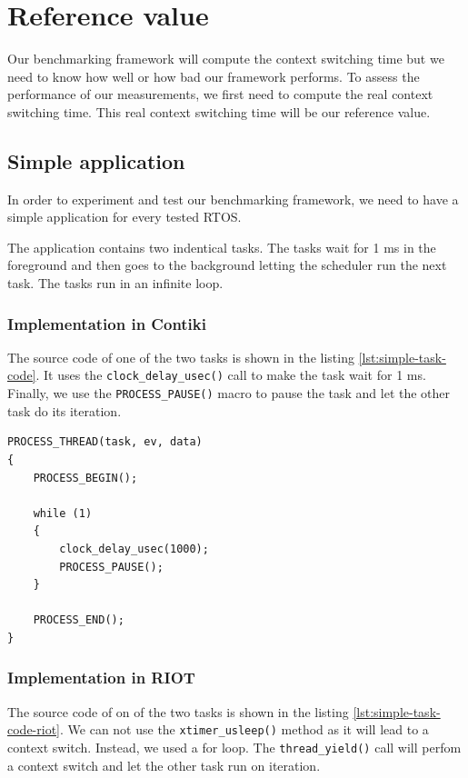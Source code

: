 \section{Reference value \label{sec:reference}}

Our benchmarking framework will compute the context switching time but we need to know how well or how bad our framework performs.
To assess the performance of our measurements, we first need to compute the real context switching time.
This real context switching time will be our reference value.

\subsection{Simple application}
In order to experiment and test our benchmarking framework, we need to have a simple application for every tested RTOS.

The application contains two indentical tasks.
The tasks wait for 1 ms in the foreground and then goes to the background letting the scheduler run the next task.
The tasks run in an infinite loop.

\subsubsection{Implementation in Contiki}
The source code of one of the two tasks is shown in the listing \ref{lst:simple-task-code}.
It uses the \texttt{clock\_delay\_usec()} call to make the task wait for 1 ms.
Finally, we use the \texttt{PROCESS\_PAUSE()} macro to pause the task and let the other task do its iteration.

\begin{lstlisting}[style=CStyle, float, label={lst:simple-task-code}, caption={source code of a task implemented in Contiki for the simple application}]
PROCESS_THREAD(task, ev, data)
{
    PROCESS_BEGIN();

    while (1)
    {
        clock_delay_usec(1000);
        PROCESS_PAUSE();
    }

    PROCESS_END();
}
\end{lstlisting}

\subsubsection{Implementation in RIOT}
The source code of on of the two tasks is shown in the listing \ref{lst:simple-task-code-riot}.
We can not use the \texttt{xtimer\_usleep()} method as it will lead to a context switch.
Instead, we used a for loop.
The \texttt{thread\_yield()} call will perfom a context switch and let the other task run on iteration.

